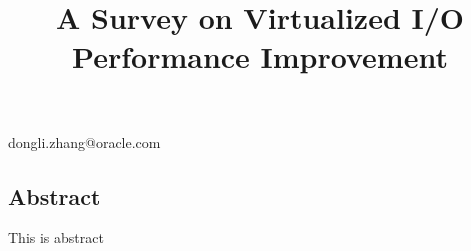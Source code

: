 \documentclass[10pt,reprint]{socc14}
\begin{document}
\date{}

\title{A Survey on Virtualized I/O Performance Improvement}
\subtitle{}


           {}
		   {dongli.zhang@oracle.com}

\maketitle
%
%

\subsection*{Abstract}
This is abstract





\end{document}
